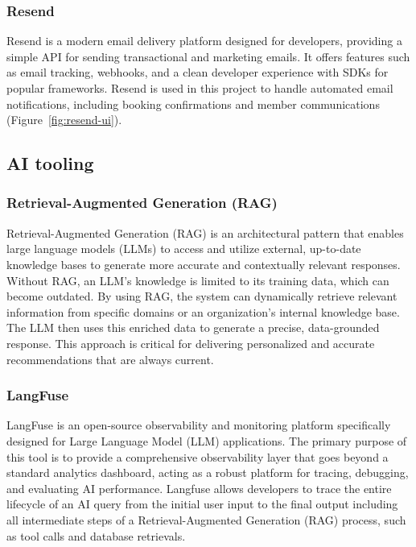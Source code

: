 \subsubsection{Resend}
Resend \cite{resend2023docs} is a modern email delivery platform designed for developers, providing a simple API for sending transactional and marketing emails. It offers features such as email tracking, webhooks, and a clean developer experience with SDKs for popular frameworks. Resend is used in this project to handle automated email notifications, including booking confirmations and member communications (Figure~\ref{fig:resend-ui}).

\subsection{AI tooling}
\subsubsection{Retrieval-Augmented Generation (RAG)}
Retrieval-Augmented Generation (RAG) \cite{aws2025rag} is an architectural pattern that enables large language models (LLMs) to access and utilize external, up-to-date knowledge bases to generate more accurate and contextually relevant responses. Without RAG, an LLM's knowledge is limited to its training data, which can become outdated. By using RAG, the system can dynamically retrieve relevant information from specific domains or an organization's internal knowledge base. The LLM then uses this enriched data to generate a precise, data-grounded response. This approach is critical for delivering personalized and accurate recommendations that are always current.
\subsubsection{LangFuse}
LangFuse \cite{politecnico2026genai}  is an open-source observability and monitoring platform specifically designed for Large Language Model (LLM) applications. The primary purpose of this tool is to provide a comprehensive observability layer that goes beyond a standard analytics dashboard, acting as a robust platform for tracing, debugging, and evaluating AI performance. Langfuse allows developers to trace the entire lifecycle of an AI query from the initial user input to the final output including all intermediate steps of a Retrieval-Augmented Generation (RAG) process, such as tool calls and database retrievals.

